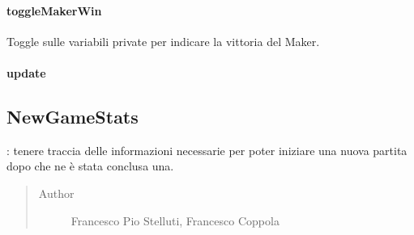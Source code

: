 \documentclass[letterpaper,10pt,italian]{sphinxmanual}
\begin{document}
\paragraph{toggleMakerWin}
\label{\detokenize{source/it/unicam/cs/pa/mastermind/gamecore/CurrentGameStats:togglemakerwin}}

\begin{fulllineitems}
\label{\detokenize{source/it/unicam/cs/pa/mastermind/gamecore/CurrentGameStats:it.unicam.cs.pa.mastermind.gamecore.CurrentGameStats.toggleMakerWin()}}
Toggle sulle variabili private per indicare la vittoria del Maker.

\end{fulllineitems}



\paragraph{update}
\label{\detokenize{source/it/unicam/cs/pa/mastermind/gamecore/CurrentGameStats:update}}

\begin{fulllineitems}
\label{\detokenize{source/it/unicam/cs/pa/mastermind/gamecore/CurrentGameStats:it.unicam.cs.pa.mastermind.gamecore.CurrentGameStats.update()}}
\end{fulllineitems}



\subsection{NewGameStats}
\label{\detokenize{source/it/unicam/cs/pa/mastermind/gamecore/NewGameStats:newgamestats}}\label{\detokenize{source/it/unicam/cs/pa/mastermind/gamecore/NewGameStats::doc}}

\begin{fulllineitems}
\label{\detokenize{source/it/unicam/cs/pa/mastermind/gamecore/NewGameStats:it.unicam.cs.pa.mastermind.gamecore.NewGameStats}}
: tenere traccia delle informazioni necessarie per poter iniziare una nuova partita dopo che ne è stata conclusa una.
\begin{quote}\begin{description}
\item[{Author}] \leavevmode
Francesco Pio Stelluti, Francesco Coppola

\end{description}\end{quote}

\end{fulllineitems}
\end{document}
